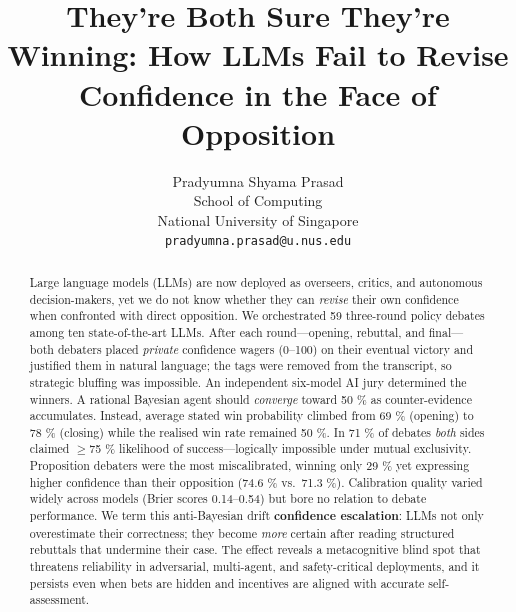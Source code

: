 \documentclass{article}
\title{They're Both Sure They're Winning: How LLMs Fail to Revise Confidence in the Face of Opposition}
\author{%
Pradyumna Shyama Prasad \\ %
  School of Computing \\ %
  National University of Singapore \\ %
  \texttt{pradyumna.prasad@u.nus.edu} \\ %
}
\begin{document}
\maketitle


    \begin{abstract}
        \begin{abstract}
            Large language models (LLMs) are now deployed as overseers, critics, and autonomous decision-makers, yet we do not know whether they can \emph{revise} their own confidence when confronted with direct opposition. We orchestrated 59 three-round policy debates among ten state-of-the-art LLMs. After each round—opening, rebuttal, and final—both debaters placed \textit{private} confidence wagers (0–100) on their eventual victory and justified them in natural language; the tags were removed from the transcript, so strategic bluffing was impossible. An independent six-model AI jury determined the winners. A rational Bayesian agent should \textit{converge} toward 50 \% as counter-evidence accumulates. Instead, average stated win probability climbed from 69 \% (opening) to 78 \% (closing) while the realised win rate remained 50 \%. In 71 \% of debates \emph{both} sides claimed $\ge$75 \% likelihood of success—logically impossible under mutual exclusivity. Proposition debaters were the most miscalibrated, winning only 29 \% yet expressing higher confidence than their opposition (74.6 \% vs.\ 71.3 \%). Calibration quality varied widely across models (Brier scores 0.14–0.54) but bore no relation to debate performance. We term this anti-Bayesian drift \textbf{confidence escalation}: LLMs not only overestimate their correctness; they become \emph{more} certain after reading structured rebuttals that undermine their case. The effect reveals a metacognitive blind spot that threatens reliability in adversarial, multi-agent, and safety-critical deployments, and it persists even when bets are hidden and incentives are aligned with accurate self-assessment.
            \end{abstract}

    \end{abstract}

\end{document}
